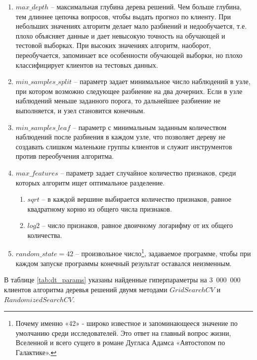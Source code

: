 \begin{enumerate}[nosep]
	\item $max\_depth$ -- максимальная глубина дерева решений. Чем больше глубина, тем длиннее цепочка вопросов, чтобы выдать прогноз по клиенту. При небольших значениях алгоритм делает мало разбиений и недообучается, т.е. плохо объясняет данные и дает невысокую точность на обучающей и тестовой выборках. При высоких значениях алгоритм, наоборот, переобучается, запоминает все особенности обучающей выборки, но плохо классифицирует клиентов на тестовых данных.
	\item $min\_samples\_split$ -- параметр задает минимальное число наблюдений в узле, при котором возможно следующее разбиение на два дочерних. Если в узле наблюдений меньше заданного порога, то дальнейшее разбиение не выполняется, и узел становится конечным.
	\item $min\_samples\_leaf$ -- параметр с минимальным заданным количеством наблюдений после разбиения в каждом узле, что позволяет дереву не создавать слишком маленькие группы клиентов и служит инструментов против переобучения алгоритма.
	\item $max\_features$ -- параметр задает случайное количество признаков, среди которых алгоритм ищет оптимальное разделение.
	\begin{enumerate}[nosep]
		\item [a)] $sqrt$ -- в каждой вершине выбирается количество признаков, равное квадратному корню из общего числа признаков.
		\item [b)] $log2$ -- число признаков, равное двоичному логарифму от их общего количества.
	\end{enumerate}
	\item $random\_state = 42$ -- произвольное число\footnote{Почему именно «42» - широко известное и запоминающееся значение по умолчанию среди исследователей. Это ответ на главный вопрос жизни, Вселенной и всего сущего в романе Дугласа Адамса «Автостопом по Галактике».}, задаваемое программе, чтобы при каждом запуске программы конечный результат оставался неизменным. 
\end{enumerate}

В таблице \ref{tab:dt_params} указаны найденные гиперпараметры на 3\ 000\ 000 клиентов алгоритма деревья решений двумя методами $GridSearchCV$ и $RandomizedSearchCV$.

